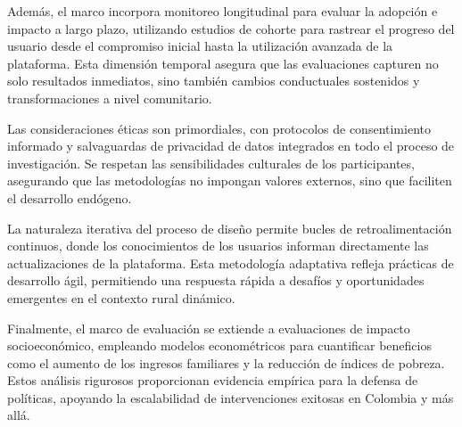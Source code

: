 Además, el marco incorpora monitoreo longitudinal para evaluar la adopción e impacto a largo plazo, utilizando estudios de cohorte para rastrear el progreso del usuario desde el compromiso inicial hasta la utilización avanzada de la plataforma. Esta dimensión temporal asegura que las evaluaciones capturen no solo resultados inmediatos, sino también cambios conductuales sostenidos y transformaciones a nivel comunitario.

Las consideraciones éticas son primordiales, con protocolos de consentimiento informado y salvaguardas de privacidad de datos integrados en todo el proceso de investigación. Se respetan las sensibilidades culturales de los participantes, asegurando que las metodologías no impongan valores externos, sino que faciliten el desarrollo endógeno.

La naturaleza iterativa del proceso de diseño permite bucles de retroalimentación continuos, donde los conocimientos de los usuarios informan directamente las actualizaciones de la plataforma. Esta metodología adaptativa refleja prácticas de desarrollo ágil, permitiendo una respuesta rápida a desafíos y oportunidades emergentes en el contexto rural dinámico.

Finalmente, el marco de evaluación se extiende a evaluaciones de impacto socioeconómico, empleando modelos econométricos para cuantificar beneficios como el aumento de los ingresos familiares y la reducción de índices de pobreza. Estos análisis rigurosos proporcionan evidencia empírica para la defensa de políticas, apoyando la escalabilidad de intervenciones exitosas en Colombia y más allá.